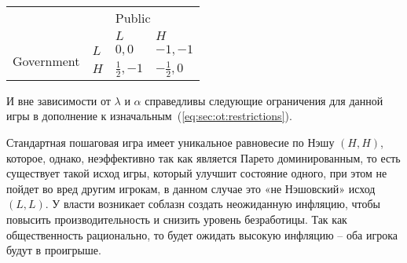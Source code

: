 \begin{table}[h]
	\centering
	\begin{tabular}{|l|l|l|l|}
		\hline
		\multicolumn{2}{|l|}{\multirow{2}{*}{}} & \multicolumn{2}{l|}{Public} \\ \cline{3-4} 
		\multicolumn{2}{|l|}{}                  & $L$            & $H$            \\ \hline
		\multirow{2}{*}{Government}     & $L$     & $0,0$          & $-1,-1$          \\ \cline{2-4} 
		& $H$     & $\frac{1}{2},-1$          & $-\frac{1}{2},0$          \\ \hline
	\end{tabular}
	\caption{}	
	\label{table:sec:ot:real}
\end{table}


И вне зависимости от $\lambda$ и  $\alpha$ справедливы следующие ограничения для данной игры в дополнение к изначальным~(\ref{eq:sec:ot:restrictions}).

Стандартная пошаговая игра имеет уникальное равновесие по Нэшу $(H,H)$,
которое, однако, неэффективно так как является Парето доминированным, то есть существует такой исход игры, который улучшит состояние одного, при этом не пойдет во вред другим игрокам, в данном случае это «не Нэшовский» исход $(L,L)$.  У власти возникает соблазн создать неожиданную инфляцию, чтобы повысить производительность и снизить уровень безработицы. Так как общественность рационально, то будет ожидать высокую инфляцию – оба игрока будут в проигрыше. 

